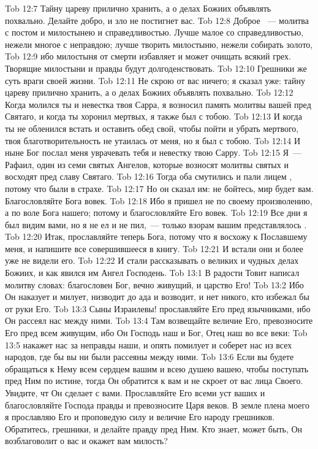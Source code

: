 \vs Tob 12:7 Тайну цареву прилично хранить, а о делах Божиих объявлять похвально. Делайте добро, и зло не постигнет вас.
\vs Tob 12:8 Доброе ~--- молитва с постом и милостынею и справедливостью. Лучше малое со справедливостью, нежели многое с неправдою; лучше творить милостыню, нежели собирать золото,
\vs Tob 12:9 ибо милостыня от смерти избавляет и может очищать всякий грех. Творящие милостыни и  правды будут долгоденствовать.
\vs Tob 12:10 Грешники же суть враги своей жизни.
\vs Tob 12:11 Не скрою от вас ничего; я сказал уже: тайну цареву прилично хранить, а о делах Божиих объявлять похвально.
\vs Tob 12:12 Когда молился ты и невестка твоя Сарра, я возносил память молитвы вашей пред Святаго, и когда ты хоронил мертвых, я также был с тобою.
\vs Tob 12:13 И когда ты не обленился встать и оставить обед свой, чтобы пойти и убрать мертвого, твоя благотворительность не утаилась от меня, но я был с тобою.
\vs Tob 12:14 И ныне Бог послал меня уврачевать тебя и невестку твою Сарру.
\vs Tob 12:15 Я~--- Рафаил, один из семи святых Ангелов, которые возносят молитвы святых и восходят пред славу Святаго.
\rsbpar\vs Tob 12:16 Тогда оба смутились и пали лицем , потому что были в страхе.
\vs Tob 12:17 Но он сказал им: не бойтесь, мир будет вам. Благословляйте Бога вовек.
\vs Tob 12:18 Ибо я пришел не по своему произволению, а по воле Бога нашего; потому и благословляйте Его вовек.
\vs Tob 12:19 Все дни я был видим вами, но я не ел и не пил,~--- только взорам вашим представлялось .
\vs Tob 12:20 Итак, прославляйте теперь Бога, потому что я восхожу к Пославшему меня, и напишите все совершившееся в книгу.
\vs Tob 12:21 И встали они и более уже не видели его.
\vs Tob 12:22 И стали рассказывать о великих и чудных делах Божиих, и как явился им Ангел Господень.
\vs Tob 13:1 В радости Товит написал молитву  словах: благословен Бог, вечно живущий, и  царство Его!
\vs Tob 13:2 Ибо Он наказует и милует, низводит до ада и возводит, и нет никого, кто избежал бы от руки Его.
\vs Tob 13:3 Сыны Израилевы! прославляйте Его пред язычниками, ибо Он рассеял нас между ними.
\vs Tob 13:4 Там возвещайте величие Его, превозносите Его пред всем живущим, ибо Он Господь наш и Бог, Отец наш во все веки:
\vs Tob 13:5 накажет нас за неправды наши, и опять помилует и соберет нас из всех народов, где бы вы ни были рассеяны между ними.
\vs Tob 13:6 Если вы будете обращаться к Нему всем сердцем вашим и всею душею вашею, чтобы поступать пред Ним по истине, тогда Он обратится к вам и не скроет от вас лица Своего. Увидите, чт Он сделает с вами. Прославляйте Его всеми  уст ваших и благословляйте Господа правды и превозносите Царя веков. В земле плена моего я прославляю Его и проповедую силу и величие Его народу грешников. Обратитесь, грешники, и делайте правду пред Ним. Кто знает, может быть, Он возблаговолит о вас и окажет вам милость?
